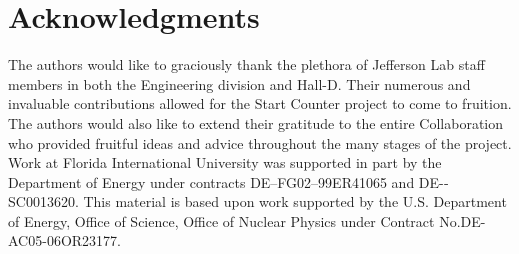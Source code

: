 \section{Acknowledgments}

The authors would like to graciously thank the plethora of Jefferson Lab staff members in both the Engineering division and Hall-D.  Their numerous and invaluable contributions allowed for the Start Counter project to come to fruition.  The authors would also like to extend their gratitude to the entire \gx{} Collaboration who provided fruitful ideas and advice throughout the many stages of the project.  Work at Florida International University was supported in part by the Department of Energy under contracts DE–FG02–99ER41065 and DE-­SC0013620.  This material is based upon work supported by the U.S. Department of Energy, Office of Science, Office of Nuclear Physics under Contract No.DE-AC05-06OR23177. 